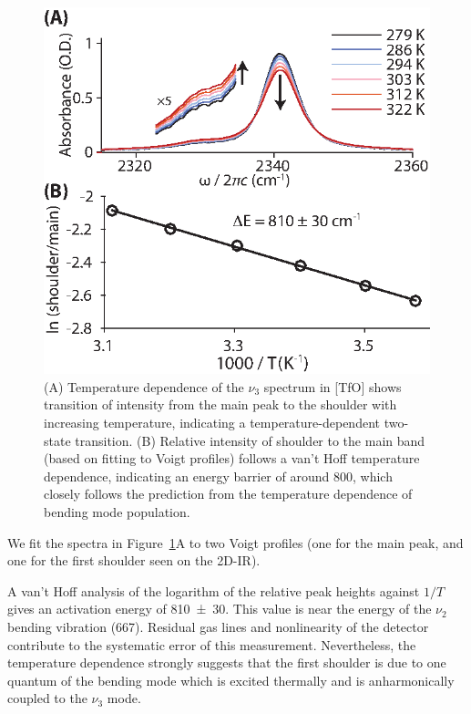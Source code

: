 {\begin{figure}
  \centering
  \includegraphics[scale=1.25]{./paper_01/fig3.eps}
  \caption[T-dependent FTIR of carbon dioxide in 1-butyl-3-methylimidazolium triflate]{\label{fig:hot band}(A) Temperature dependence of the \(\nu_3\) spectrum in \ce{[Im_{4,1}]}[TfO] shows transition of intensity from the main peak to the shoulder with increasing temperature, indicating a temperature-dependent two-state transition. (B) Relative intensity of shoulder to the main band (based on fitting to Voigt profiles) follows a van't Hoff temperature dependence, indicating an energy barrier of around \SI{800}{\wavenumber}, which closely follows the prediction from the temperature dependence of bending mode population.}
\end{figure}

We fit the spectra in Figure~\ref{fig:hot band}A to two Voigt profiles (one for the main peak, and one for the first shoulder seen on the 2D-IR).

A van't Hoff analysis of the logarithm of the relative peak heights against \(1/T\) gives an activation energy of \SI{810(30)}{\wavenumber}. This value is near the energy of the \(\nu_2\) bending vibration (\SI{667}{\wavenumber}). Residual gas lines and nonlinearity of the detector contribute to the systematic error of this measurement. Nevertheless, the temperature dependence strongly suggests that the first shoulder is due to one quantum of the bending mode which is excited thermally and is anharmonically coupled to the \(\nu_3\) mode.

}
